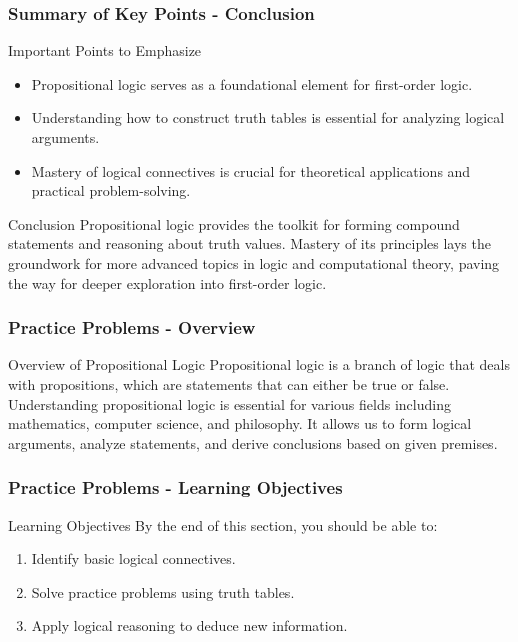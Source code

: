 \documentclass[aspectratio=169]{beamer}
\begin{document}
\begin{frame}[fragile]
    \frametitle{Summary of Key Points - Conclusion}
    \begin{block}{Important Points to Emphasize}
        \begin{itemize}
            \item Propositional logic serves as a foundational element for first-order logic.
            \item Understanding how to construct truth tables is essential for analyzing logical arguments.
            \item Mastery of logical connectives is crucial for theoretical applications and practical problem-solving.
        \end{itemize}
    \end{block}
    
    \begin{block}{Conclusion}
        Propositional logic provides the toolkit for forming compound statements and reasoning about truth values.
        Mastery of its principles lays the groundwork for more advanced topics in logic and computational theory, paving the way for deeper exploration into first-order logic.
    \end{block}
\end{frame}

\begin{frame}[fragile]
    \frametitle{Practice Problems - Overview}
    \begin{block}{Overview of Propositional Logic}
        Propositional logic is a branch of logic that deals with propositions, which are statements that can either be true or false. Understanding propositional logic is essential for various fields including mathematics, computer science, and philosophy. It allows us to form logical arguments, analyze statements, and derive conclusions based on given premises.
    \end{block}
\end{frame}

\begin{frame}[fragile]
    \frametitle{Practice Problems - Learning Objectives}
    \begin{block}{Learning Objectives}
        By the end of this section, you should be able to:
        \begin{enumerate}
            \item Identify basic logical connectives.
            \item Solve practice problems using truth tables.
            \item Apply logical reasoning to deduce new information.
        \end{enumerate}
    \end{block}
\end{frame}
\end{document}
